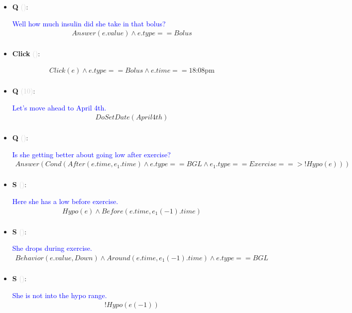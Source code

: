 \documentclass[11pt]{article}
\newcounter{CQ}
\newcounter{CS}
\newcounter{CClick}
\newcommand{\key}[1]{\textcolor{lightgray}{#1}}
\begin{document}
\begin{itemize}
	\item
	\textbf{Q\theCQ} \key{()}: \addtocounter{CQ}{1}
	\textcolor{blue}{ Well how much insulin did she take in that bolus? }
	\begin{multline*}
	Answer(e.value) \wedge e.type == Bolus \\
	\end{multline*}
	
	\item
	\textbf{Click\theCClick} \key{()}: \addtocounter{CClick}{1}
	\begin{multline*}
	Click(e) \wedge e.type == Bolus \wedge e.time == \mbox{18:08pm}  \\
	\end{multline*}
	
	\item
	\textbf{Q\theCQ} \key{(10)}: \addtocounter{CQ}{1}
	\textcolor{blue}{ Let's move ahead to April 4th. }
	\begin{multline*}
	DoSetDate(April4th) \\
	\end{multline*}
	
	\item
	\textbf{Q\theCQ} \key{()}: \addtocounter{CQ}{1}
	\textcolor{blue}{ Is she getting better about going low after exercise?}
	\begin{multline*}
	Answer( Cond(After(e.time, e_1.time) \wedge e.type==BGL \wedge e_1.type==Exercise ==> !Hypo(e)) )  \\
	\end{multline*}
	
    
	\item
	\textbf{S\theCS} \key{()}: \addtocounter{CS}{1}
	\textcolor{blue}{ Here she has a low before exercise. }
	\begin{multline*}
    Hypo(e) \wedge Before(e.time, e_1(-1).time) \\
	\end{multline*}
	
    
	\item
	\textbf{S\theCS} \key{()}: \addtocounter{CS}{1}
	\textcolor{blue}{ She drops during exercise. }
	\begin{multline*}
    Behavior(e.value, Down) \wedge Around(e.time, e_1(-1).time) \wedge e.type == BGL  \\ 
	\end{multline*}
    
    
    \item
	\textbf{S\theCS} \key{()}: \addtocounter{CS}{1}
	\textcolor{blue}{ She is not into the hypo range. }
	\begin{multline*}
	!Hypo(e(-1)) \\
	\end{multline*}
    

\end{itemize}
\end{document}
